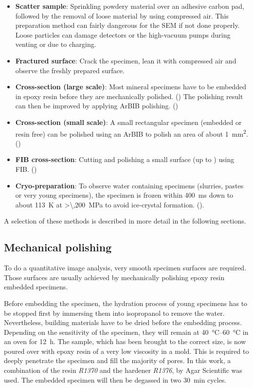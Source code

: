 \begin{itemize}
	\item \textbf{Scatter sample}: Sprinkling powdery material over an adhesive carbon pad, followed by the removal of loose material by using compressed air.
	This preparation method can fairly dangerous for the \ac{SEM} if not done properly.
	Loose particles can damage detectors or the high-vacuum pumps during venting or due to charging.
	\item \textbf{Fractured surface}: Crack the specimen, lean it with compressed air and observe the freshly prepared surface.
	\item \textbf{Cross-section (large scale)}: Most mineral specimens have to be embedded in epoxy resin before they are mechanically polished. () The polishing result can then be improved by applying \ac{ArBIB} polishing. ()
	\item \textbf{Cross-section (small scale)}: A small rectangular specimen (embedded or resin free) can be polished using an \ac{ArBIB} to polish an area of about \qty{1}{\square\milli\meter}. ()
	\item \textbf{\Ac{FIB} cross-section}: Cutting and polishing a small surface (up to ) using \ac{FIB}. ()
	\item \textbf{Cryo-preparation}: To observe water containing specimens (slurries, pastes or very young specimens), the specimen is frozen within \qty{400}{\milli\second} down to about \qty{113}{\kelvin} at \qty{>\,200}{\mega\pascal} to avoid ice-crystal formation. ().
\end{itemize}

A selection of these methods is described in more detail in the following sections.

\subsection{Mechanical polishing}
\label{sec:mech_pol}

To do a quantitative image analysis, very smooth specimen surfaces are required.
Those surfaces are usually achieved by mechanically polishing epoxy resin embedded specimens.

Before embedding the specimen, the hydration process of young specimens has to be stopped first by immersing them into isopropanol to remove the water.
Nevertheless, building materials have to be dried before the embedding process.
Depending on the sensitivity of the specimen, they will remain at \qtyrange{40}{60}{\celsius} in an oven for \qty{12}{\hour}.
The sample, which has been brought to the correct size, is now poured over with epoxy resin of a very low viscosity in a mold.
This is required to deeply penetrate the specimen and fill the majority of pores.
In this work, a combination of the resin \textit{R1370} and the hardener \textit{R1376}, by Agar Scientific was used.
The embedded specimen will then be degassed in two \qty{30}{\minute} cycles.

